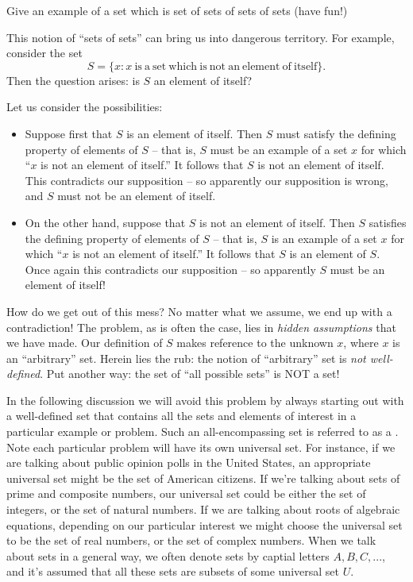 \begin{exercise}
Give an example of a set which is set of sets of sets of sets (have fun!)
\end{exercise}

This notion of ``sets of sets'' can bring us into dangerous territory. For example, consider the set 
\[S = \{ x : x \mathrm{~is~a~set~which~is~not~an~element~of~itself} \}. \]
Then the question arises: is $S$ an element of itself? 

Let us consider the possibilities:
\begin{itemize}
\item
 Suppose first that $S$ is an element of itself. 
Then $S$ must satisfy the defining property of elements of  $S$ -- that is, $S$ must be an example of a set $x$ for which ``$x$ is  not an element of itself.'' It follows that $S$ is not an element of itself.  This contradicts our supposition -- so apparently our supposition is wrong, and $S$ must not be an element of itself.
\item
On the other hand, suppose that $S$ is not an element of itself. Then $S$ satisfies the defining property of elements of  $S$ -- that is, $S$ is an example of a set $x$ for which ``$x$ is  not an element of itself.'' It follows that $S$ is an element of $S$.  Once again this contradicts our supposition -- so apparently $S$ must be an element of itself!
\end{itemize}
How do we get out of this mess? No matter what we assume, we end up with a contradiction! The problem, as is often the case, lies in  \emph{hidden assumptions} that we have made. Our definition of $S$ makes reference to the unknown $x$, where $x$ is an ``arbitrary'' set. Herein lies the rub:  the notion of ``arbitrary'' set is \emph{not well-defined}. Put another way: the set of ``all possible sets'' is NOT a set!

In the following discussion we will avoid this problem by always starting out with a well-defined set that contains all the sets and elements of interest in a particular example or problem. Such an all-encompassing set is referred to as a . Note each particular problem will have its own universal set. For instance, if we are talking about public opinion polls  in the United States, an appropriate universal set might be the set of American citizens. If we're talking about sets of prime and composite numbers, our universal set could be either the set of integers, or the set of natural numbers. If we are talking about roots of algebraic equations, depending on our particular interest we might choose the universal set to be the set of real numbers, or the set of complex numbers. When we talk about sets in a general way, we often denote sets by captial  letters $A, B, C,...$, and it's assumed that all these sets are subsets of some universal set $U$.

